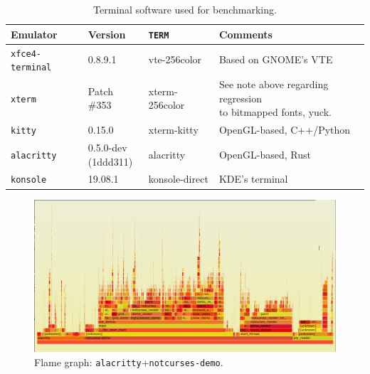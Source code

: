 \begin{table}[!htb]
  \centering
  \begin{tabular}{|l|l|l|l|}
    \hline
    Emulator & Version & \texttt{TERM} & Comments \\
    \hline
    \hline
    \texttt{xfce4-terminal} & 0.8.9.1 & vte-256color & Based on GNOME's VTE\cite{gnomevte} \\
    \hline
    \texttt{xterm} & Patch \#353 & xterm-256color & \makecell[l]{See note above regarding regression\\
      to bitmapped fonts, yuck.} \\
    \hline
    \texttt{kitty} & 0.15.0 & xterm-kitty & OpenGL-based, C++/Python \\
    \hline
    \texttt{alacritty} & \makecell[l]{0.5.0-dev\\(1ddd311)} & alacritty & OpenGL-based, Rust \\
    \hline
    \texttt{konsole} & 19.08.1 & konsole-direct & KDE's terminal \\
    \hline
  \end{tabular}
\caption{Terminal software used for benchmarking.}
\label{table:benchterms}
\end{table}

\begin{figure}[!htb]
\centering
\includegraphics[width=1\textwidth]{media/fg-demo-alacritty.png}
\caption{Flame graph: \texttt{alacritty}+\texttt{notcurses-demo}.}
\label{fig:fg-demo-alacritty}
\end{figure}

